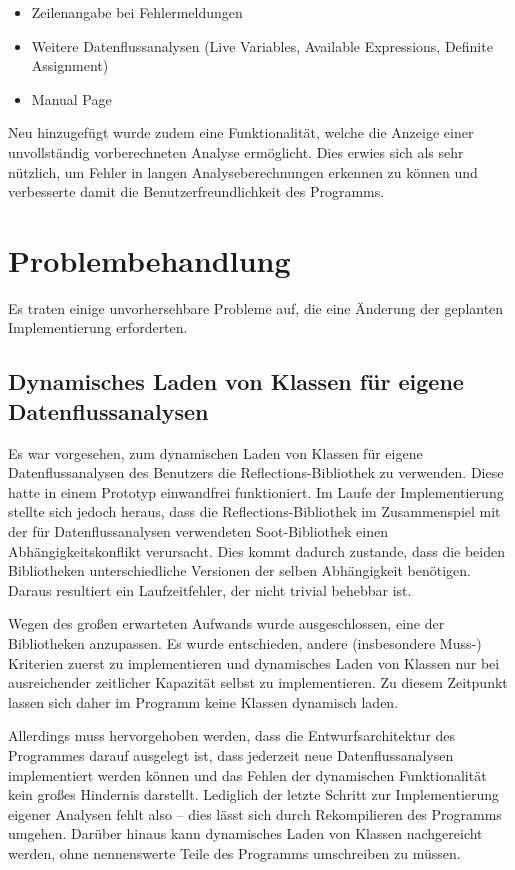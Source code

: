 \begin{itemize}
  \item Zeilenangabe bei Fehlermeldungen
  \item Weitere Datenflussanalysen (Live Variables, Available Expressions, Definite Assignment)
  \item Manual Page
\end{itemize}

Neu hinzugefügt wurde zudem eine Funktionalität, welche die Anzeige einer unvollständig vorberechneten Analyse ermöglicht.
Dies erwies sich als sehr nützlich, um Fehler in langen Analyseberechnungen erkennen zu können und verbesserte damit die Benutzerfreundlichkeit des Programms.

\newpage
\section{Problembehandlung}

Es traten einige unvorhersehbare Probleme auf, die eine Änderung der geplanten Implementierung erforderten.

\subsection{Dynamisches Laden von Klassen für eigene Datenflussanalysen}

Es war vorgesehen, zum dynamischen Laden von Klassen für eigene Datenflussanalysen des Benutzers die Reflections-Bibliothek zu verwenden.
Diese hatte in einem Prototyp einwandfrei funktioniert.
Im Laufe der Implementierung stellte sich jedoch heraus, dass die Reflections-Bibliothek im Zusammenspiel mit der für Datenflussanalysen verwendeten Soot-Bibliothek einen Abhängigkeitskonflikt verursacht.
Dies kommt dadurch zustande, dass die beiden Bibliotheken unterschiedliche Versionen der selben Abhängigkeit benötigen. 
Daraus resultiert ein Laufzeitfehler, der nicht trivial behebbar ist.

Wegen des großen erwarteten Aufwands wurde ausgeschlossen, eine der Bibliotheken anzupassen. 
Es wurde entschieden, andere (insbesondere Muss-) Kriterien zuerst zu implementieren und dynamisches Laden von Klassen nur bei ausreichender zeitlicher Kapazität selbst zu implementieren.
Zu diesem Zeitpunkt lassen sich daher im Programm keine Klassen dynamisch laden.

Allerdings muss hervorgehoben werden, dass die Entwurfsarchitektur des Programmes darauf ausgelegt ist, dass jederzeit neue Datenflussanalysen implementiert werden können und das Fehlen der dynamischen Funktionalität kein großes Hindernis darstellt.
Lediglich der letzte Schritt zur Implementierung eigener Analysen fehlt also – dies lässt sich durch Rekompilieren des Programms umgehen.
Darüber hinaus kann dynamisches Laden von Klassen nachgereicht werden, ohne nennenswerte Teile des Programms umschreiben zu müssen.

